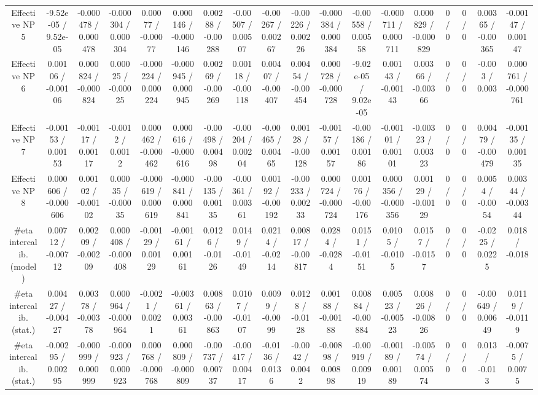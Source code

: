 \documentclass[10pt]{article}
\begin{document}
\begin{table}[htbp]
\begin{center}
\begin{tabular}{|c|c|c|c|c|c|c|c|c|c|c|c|c|c|c|c|c|c|}
  Effective NP 5 & -9.52e-05 / 9.52e-05 & -0.000478 / 0.000478 & -0.000304 / 0.000304 & 0.00077 / -0.00077 & 0.000146 / -0.000146 & 0.00288 / -0.00288 & -0.00507 / 0.00507 & -0.00267 / 0.00267 & -0.00226 / 0.00226 & -0.000384 / 0.000384 & -0.00558 / 0.00558 & -0.000711 / 0.000711 & 0.000829 / -0.000829 & 0 / 0 & 0 / 0 & 0.00365 / -0.00365 & -0.00147 / 0.00147 \\ 
  Effective NP 6 & 0.00106 / -0.00106 & 0.000824 / -0.000824 & 0.00025 / -0.00025 & -0.000224 / 0.000224 & -0.000945 / 0.000945 & 0.00269 / -0.00269 & 0.00118 / -0.00118 & 0.00407 / -0.00407 & 0.00454 / -0.00454 & 0.000728 / -0.000728 & -9.02e-05 / 9.02e-05 & 0.00143 / -0.00143 & 0.00366 / -0.00366 & 0 / 0 & 0 / 0 & -0.003 / 0.003 & 0.000761 / -0.000761 \\ 
  Effective NP 7 & -0.00153 / 0.00153 & -0.00117 / 0.00117 & -0.0012 / 0.0012 & 0.000462 / -0.000462 & 0.000616 / -0.000616 & -0.00498 / 0.00498 & -0.00204 / 0.00204 & -0.00465 / 0.00465 & 0.00128 / -0.00128 & -0.00157 / 0.00157 & -0.00186 / 0.00186 & -0.00101 / 0.00101 & -0.00323 / 0.00323 & 0 / 0 & 0 / 0 & 0.00479 / -0.00479 & -0.00135 / 0.00135 \\ 
  Effective NP 8 & 0.000606 / -0.000606 & 0.00102 / -0.00102 & 0.00035 / -0.00035 & -0.000619 / 0.000619 & -0.000841 / 0.000841 & -0.00135 / 0.00135 & -0.00361 / 0.00361 & 0.00192 / -0.00192 & -0.00233 / 0.00233 & 0.000724 / -0.000724 & 0.00176 / -0.00176 & 0.000356 / -0.000356 & 0.00129 / -0.00129 & 0 / 0 & 0 / 0 & 0.0054 / -0.0054 & 0.00344 / -0.00344 \\ 
  #eta intercalib. (model) & 0.00712 / -0.00712 & 0.00209 / -0.00209 & 0.000408 / -0.000408 & -0.00129 / 0.00129 & -0.00161 / 0.00161 & 0.0126 / -0.0126 & 0.0149 / -0.0149 & 0.0214 / -0.0214 & 0.00817 / -0.00817 & 0.0284 / -0.0284 & 0.0151 / -0.0151 & 0.0105 / -0.0105 & 0.0157 / -0.0157 & 0 / 0 & 0 / 0 & -0.0225 / 0.0225 & 0.018 / -0.018 \\ 
  #eta intercalib. (stat.) & 0.00427 / -0.00427 & 0.00378 / -0.00378 & 0.000964 / -0.000964 & -0.0021 / 0.0021 & -0.00361 / 0.00361 & 0.00863 / -0.00863 & 0.0107 / -0.0107 & 0.0099 / -0.0099 & 0.0128 / -0.0128 & 0.00188 / -0.00188 & 0.00884 / -0.00884 & 0.00523 / -0.00523 & 0.00826 / -0.00826 & 0 / 0 & 0 / 0 & -0.00649 / 0.00649 & 0.0119 / -0.0119 \\ 
  #eta intercalib. (stat.) & -0.00295 / 0.00295 & -0.000999 / 0.000999 & -0.000923 / 0.000923 & 0.000768 / -0.000768 & 0.000809 / -0.000809 & -0.00737 / 0.00737 & -0.00417 / 0.00417 & -0.0136 / 0.0136 & -0.0042 / 0.0042 & -0.00898 / 0.00898 & -0.00919 / 0.00919 & -0.00189 / 0.00189 & -0.00574 / 0.00574 & 0 / 0 & 0 / 0 & 0.013 / -0.013 & -0.0075 / 0.0075 \\ 

\end{tabular}
\end{center}
\end{table}
\end{document}
